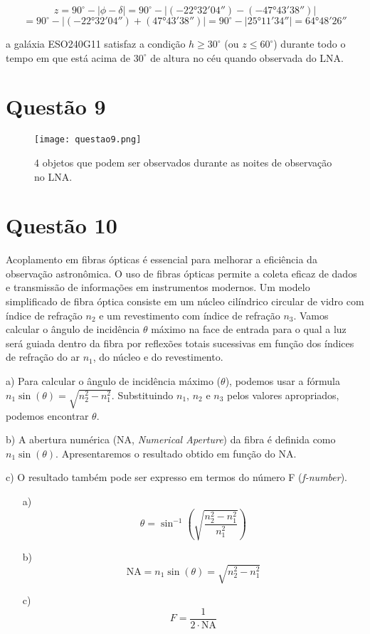 \documentclass[a4paper, 12pt]{article}
\begin{document}
\[
z = 90^\circ - \left| \phi - \delta \right| 
= 90^\circ - \left| (-22°32'04'') - (-47°43'38'') \right| 
\]
\[
= 90^\circ - \left| (-22°32'04'') + (47°43'38'') \right| 
= 90^\circ - \left| 25°11'34'' \right| 
= 64°48'26''
\]

a galáxia ESO240G11 satisfaz a condição \(h \geq 30^\circ\) (ou \(z \leq 60^\circ\)) durante todo o tempo em que está acima de \(30^\circ\) de altura no céu quando observada do LNA.


\section*{Questão 9}
\begin{figure}[h]
    \centering
    \texttt{[image: questao9.png]}
    \caption{4 objetos que podem ser observados durante as noites de observação no LNA.} %
    \label{fig:questao9}
\end{figure}


\section*{Questão 10}
Acoplamento em fibras ópticas é essencial para melhorar a eficiência da observação astronômica. O uso de fibras ópticas permite a coleta eficaz de dados e transmissão de informações em instrumentos modernos. Um modelo simplificado de fibra óptica consiste em um núcleo cilíndrico circular de vidro com índice de refração \(n_2\) e um revestimento com índice de refração \(n_3\). Vamos calcular o ângulo de incidência \(\theta\) máximo na face de entrada para o qual a luz será guiada dentro da fibra por reflexões totais sucessivas em função dos índices de refração do ar \(n_1\), do núcleo e do revestimento.

a) Para calcular o ângulo de incidência máximo (\(\theta\)), podemos usar a fórmula \(n_1 \sin(\theta) = \sqrt{n_2^2 - n_1^2}\). Substituindo \(n_1\), \(n_2\) e \(n_3\) pelos valores apropriados, podemos encontrar \(\theta\).

b) A abertura numérica (NA, \textit{Numerical Aperture}) da fibra é definida como \(n_1 \sin(\theta)\). Apresentaremos o resultado obtido em função do NA.

c) O resultado também pode ser expresso em termos do número F (\textit{f-number}).

\begin{enumerate}
    \item[a)]
    \[
    \theta = \sin^{-1}\left(\sqrt{\frac{n_2^2 - n_1^2}{n_1^2}}\right)
    \]
    
    \item[b)]
    \[
    \text{NA} = n_1 \sin(\theta) = \sqrt{n_2^2 - n_1^2}
    \]
    
    \item[c)]
    \[
    F = \frac{1}{2 \cdot \text{NA}}
    \]
\end{enumerate}
\end{document}
